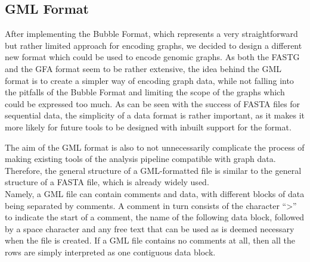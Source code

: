 \documentclass[a4paper,12pt,twoside,BCOR=10mm]{scrbook}
\begin{document}
\subsection{GML Format}

After implementing the Bubble Format, which represents a very straightforward but rather 
limited approach for encoding graphs, 
we decided to design a different new format 
which could be used to encode genomic graphs. 
As both the FASTG and the GFA format seem to be rather extensive, 
the idea behind the GML format is to create a simpler way of encoding graph data, 
while not falling into the pitfalls of the Bubble Format and limiting the scope of 
the graphs which could be expressed too much. 
As can be seen with the success of FASTA files for sequential data, 
the simplicity of a data format is rather important, as it makes it more likely 
for future tools to be designed with inbuilt support for the format.

The aim of the GML format is also to not unnecessarily complicate the process of 
making existing tools of the analysis pipeline 
compatible with graph data. 
Therefore, the general structure of a GML-formatted file is similar to the general structure 
of a FASTA file, which is already widely used. \\
Namely, a GML file can contain comments and data, with different blocks of data being separated 
by comments. A comment in turn consists of the character “>” to indicate the start of a comment, 
the name of the following data block, followed by a space character and any free text that 
can be used as is deemed necessary when the file is created. 
If a GML file contains no comments at all, 
then all the rows are simply interpreted as one contiguous data block.

%
\end{document}
